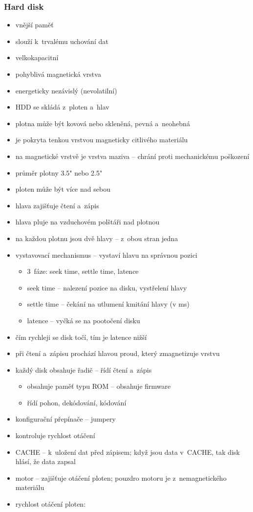 \documentclass[a4paper,12pt]{article}
\providecommand{\tightlist}{%
\setlength{\itemsep}{0pt}\setlength{\parskip}{0pt}}
\begin{document}
\subsubsection{Hard disk}

\begin{itemize}
\tightlist
\item vnější paměť
\item slouží k~trvalému uchování dat
\item velkokapacitní
\item pohyblivá magnetická vrstva
\item energeticky nezávislý (nevolatilní)
\item HDD se skládá z~ploten a~hlav
\item plotna může být kovová nebo skleněná, pevná a~neohebná
\item je pokryta tenkou vrstvou magneticky citlivého materiálu
\item na magnetické vrstvě je vrstva maziva -- chrání proti mechanickému
  poškození
\item průměr plotny 3.5" nebo 2.5"
\item ploten může být více nad sebou
\item hlava zajišťuje čtení a~zápis
\item hlava pluje na vzduchovém polštáři nad plotnou
\item na každou plotnu jsou dvě hlavy -- z~obou stran jedna
\item vystavovací mechanismus -- vystaví hlavu na správnou pozici

  \begin{itemize}
  \tightlist
  \item 3~fáze: seek time, settle time, latence
  \item seek time -- nalezení pozice na disku, vystřelení hlavy
  \item settle time -- čekání na utlumení kmitání hlavy (v ms)
  \item latence -- vyčká se na pootočení disku
  \end{itemize}
\item čím rychleji se disk točí, tím je latence nižší
\item při čtení a~zápisu prochází hlavou proud, který zmagnetizuje vrstvu
\item každý disk obsahuje řadič -- řídí čtení a~zápis

  \begin{itemize}
  \tightlist
  \item obsahuje paměť typu ROM -- obsahuje firmware
  \item řídí pohon, dekódování, kódování
  \end{itemize}
\item konfigurační přepínače -- jumpery
\item kontroluje rychlost otáčení
\item CACHE -- k~uložení dat před zápisem; když jsou data v~CACHE, tak disk
  hlásí, že data zapsal
\item motor -- zajišťuje otáčení ploten; pouzdro motoru je z~nemagnetického
  materiálu
\item rychlost otáčení ploten:


\end{itemize}
\end{document}
